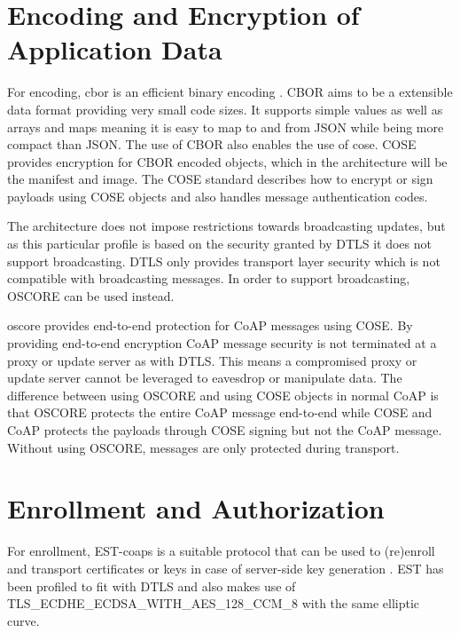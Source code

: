 \documentclass[0-thesis.tex]{subfiles}
\begin{document}
\section{Encoding and Encryption of Application Data}
\label{sec:encoding-encryption}
For encoding, \gls{cbor} is an efficient binary encoding \parencite{rfc7049}. CBOR aims to
be a extensible data format providing very small code sizes. It supports simple values as
well as arrays and maps meaning it is easy to map to and from JSON while being more
compact than JSON. The use of CBOR also enables the use of \gls{cose}. COSE provides
encryption for CBOR encoded objects, which in the architecture will be the manifest and
image. The COSE standard describes how to encrypt or sign payloads using COSE objects and
also handles message authentication codes.

The architecture does not impose restrictions towards broadcasting updates, but as this
particular profile is based on the security granted by DTLS it does not support
broadcasting. DTLS only provides transport layer security which is not compatible with
broadcasting messages. In order to support broadcasting, OSCORE can be used instead.


\gls{oscore} provides end-to-end protection for CoAP messages using COSE. By providing
end-to-end encryption CoAP message security is not terminated at a proxy or update server
as with DTLS. This means a compromised proxy or update server cannot be leveraged to
eavesdrop or manipulate data. The difference between using OSCORE and using COSE objects
in normal CoAP is that OSCORE protects the entire CoAP message end-to-end while COSE and
CoAP protects the payloads through COSE signing but not the CoAP message. Without using
OSCORE, messages are only protected during transport.

\section{Enrollment and Authorization}
\label{sec:enrollment-authorization}
For enrollment, EST-coaps is a suitable protocol that can be used to (re)enroll and
transport certificates or keys in case of server-side key generation
\parencite{est-coaps}. EST has been profiled to fit with DTLS and also makes use of
TLS\_ECDHE\_ECDSA\_WITH\_AES\_128\_CCM\_8{} with the same elliptic curve. 
\end{document}
